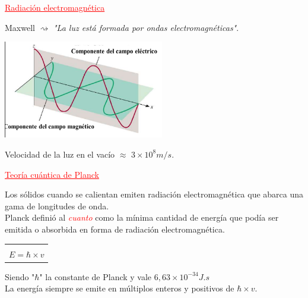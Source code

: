         \begin{center} \textcolor{red}{\underline{Radiación electromagnética}} \end{center}
            \indent Maxwell $\rightsquigarrow$ \textit{"La luz está formada por ondas electromagnéticas"}.
            \saltoPag%
            \begin{center} \includegraphics[width=7cm]{./imagenes/componentesDeUnaOnda.png} \end{center}
            \indent Velocidad de la luz en el vacío $\approx$ $3 \times 10^{8} m/s$.

        \begin{center} \textcolor{red}{\underline{Teoría cuántica de Planck}} \end{center}
            \indent Los sólidos cuando se calientan emiten radiación electromagnética que abarca una gama de longitudes de onda. \\
            \indent Planck definió al \textcolor{red}{\textit{cuanto}} como la mínima cantidad de energía que podía ser emitida o absorbida en forma de radiación electromagnética.

            \begin{center} \begin{tabular}{| c |} \hline \\ $E = \hbar \times v$ \\ \hline \end{tabular} \end{center}
            \indent Siendo "$\hbar$" la constante de Planck y vale $6,63 \times 10^{-34} J.s$ \\
            \indent La energía siempre se emite en múltiplos enteros y positivos de $\hbar \times v$.

